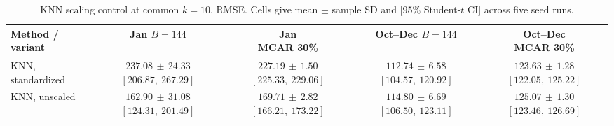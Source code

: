 \begin{table}[htbp]
\centering
\caption{{KNN scaling control at common $k=10$, RMSE. Cells give mean $\pm$ sample SD and [95\% Student-$t$ CI] across five seed runs.}}
\label{tab:p03_A11}
\begingroup
\footnotesize
\setlength{\tabcolsep}{3pt}
\renewcommand{\arraystretch}{1.15}
\begin{tabular}{lcccc}
\toprule
Method / variant & \makecell{Jan\\$B=144$} & \makecell{Jan\\MCAR 30\%} & \makecell{Oct--Dec\\$B=144$} & \makecell{Oct--Dec\\MCAR 30\%} \\
\midrule
KNN, standardized & \makecell[c]{$237.08\,\pm\,24.33$\\$[206.87,\ 267.29]$} & \makecell[c]{$227.19\,\pm\,1.50$\\$[225.33,\ 229.06]$} & \makecell[c]{$112.74\,\pm\,6.58$\\$[104.57,\ 120.92]$} & \makecell[c]{$123.63\,\pm\,1.28$\\$[122.05,\ 125.22]$} \\
KNN, unscaled & \makecell[c]{$162.90\,\pm\,31.08$\\$[124.31,\ 201.49]$} & \makecell[c]{$169.71\,\pm\,2.82$\\$[166.21,\ 173.22]$} & \makecell[c]{$114.80\,\pm\,6.69$\\$[106.50,\ 123.11]$} & \makecell[c]{$125.07\,\pm\,1.30$\\$[123.46,\ 126.69]$} \\
\bottomrule
\end{tabular}
\endgroup
\end{table}

\clearpage


